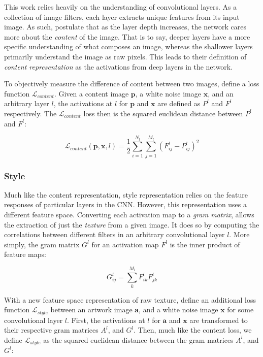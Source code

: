 \documentclass{article}
\begin{document}
This work relies heavily on the understanding of convolutional layers. As a
collection of image filters, each layer extracts unique features from its
input image. As such, \cite{gatys2016image} postulate that as the layer depth
increases, the network cares more about the \textit{content} of the image.
That is to say, deeper layers have a more specific understanding of what
composes an image, whereas the shallower layers primarily understand the image
as raw pixels. This leads to their definition of
\textit{content representation} as the activations from deep layers in the
network.

To objectively measure the difference of content between two images,
\cite{gatys2016image} define a loss function $\mathcal{L}_{content}$. Given a
content image $\textbf{p}$, a white noise image $\textbf{x}$, and an arbitrary
layer $l$, the activations at $l$ for $\textbf{p}$ and $\textbf{x}$ are
defined as $P^l$ and $F^l$ respectively. The $\mathcal{L}_{content}$ loss then
is the squared euclidean distance between $P^l$ and $F^l$:

\begin{equation}
\mathcal{L}_{content}(\mathbf{p}, \mathbf{x}, l) =
\frac{1}{2} \sum_{i=1}^{N_l}\sum_{j=1}^{M_l}{(F^l_{ij} - P^l_{ij})^2}
\end{equation}

\subsubsection{Style}

Much like the content representation, style representation relies on the
feature responses of particular layers in the \ac{CNN}. However, this
representation uses a different feature space. Converting each activation
map to a \textit{gram matrix}, allows the extraction of just the
\textit{texture} from a given image. It does so by computing the correlations
between different filters in an arbitrary convolutional layer $l$. More
simply, the gram matrix $G^l$ for an activation map $F^l$ is the inner product
of feature maps:

\begin{equation}
G_{i j}^l = \sum_{k}^{M_l} F_{i k}^l F_{j k}^l
\end{equation}

With a new feature space representation of raw texture, \cite{gatys2016image}
define an additional loss function $\mathcal{L}_{style}$ between an artwork
image $\textbf{a}$, and a white noise image $\textbf{x}$ for some
convolutional layer $l$. First, the activations at $l$ for $\textbf{a}$ and
$\textbf{x}$ are transformed to their respective gram matrices $A^l$, and
$G^l$. Then, much like the content loss, we define $\mathcal{L}_{style}$ as
the squared euclidean distance between the gram matrices $A^l$, and $G^l$:
\end{document}

